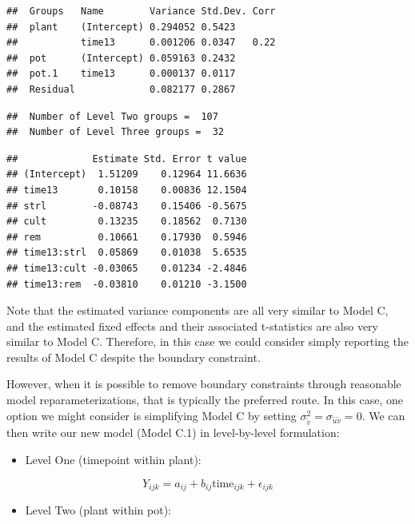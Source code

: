 \documentclass[
]{krantz}
\providecommand{\tightlist}{%
  \setlength{\itemsep}{0pt}\setlength{\parskip}{0pt}}
\begin{document}
\begin{verbatim}
##  Groups   Name        Variance Std.Dev. Corr
##  plant    (Intercept) 0.294052 0.5423       
##           time13      0.001206 0.0347   0.22
##  pot      (Intercept) 0.059163 0.2432       
##  pot.1    time13      0.000137 0.0117       
##  Residual             0.082177 0.2867
\end{verbatim}

\begin{verbatim}
##  Number of Level Two groups =  107 
##  Number of Level Three groups =  32
\end{verbatim}

\begin{verbatim}
##             Estimate Std. Error t value
## (Intercept)  1.51209    0.12964 11.6636
## time13       0.10158    0.00836 12.1504
## strl        -0.08743    0.15406 -0.5675
## cult         0.13235    0.18562  0.7130
## rem          0.10661    0.17930  0.5946
## time13:strl  0.05869    0.01038  5.6535
## time13:cult -0.03065    0.01234 -2.4846
## time13:rem  -0.03810    0.01210 -3.1500
\end{verbatim}

Note that the estimated variance components are all very similar to Model C, and the estimated fixed effects and their associated t-statistics are also very similar to Model C. Therefore, in this case we could consider simply reporting the results of Model C despite the boundary constraint.

However, when it is possible to remove boundary constraints through reasonable model reparameterizations, that is typically the preferred route. In this case, one option we might consider is simplifying Model C by setting \(\sigma_{\tilde{v}}^{2}=\sigma_{\tilde{u}\tilde{v}}=0\). We can then write our new model (Model C.1) in level-by-level formulation:

\begin{itemize}
\tightlist
\item
  Level One (timepoint within plant):
\end{itemize}

\begin{equation*}
Y_{ijk} = a_{ij}+b_{ij}\textrm{time}_{ijk}+\epsilon_{ijk}
\end{equation*}

\begin{itemize}
\tightlist
\item
  Level Two (plant within pot):
\end{itemize}
\end{document}
